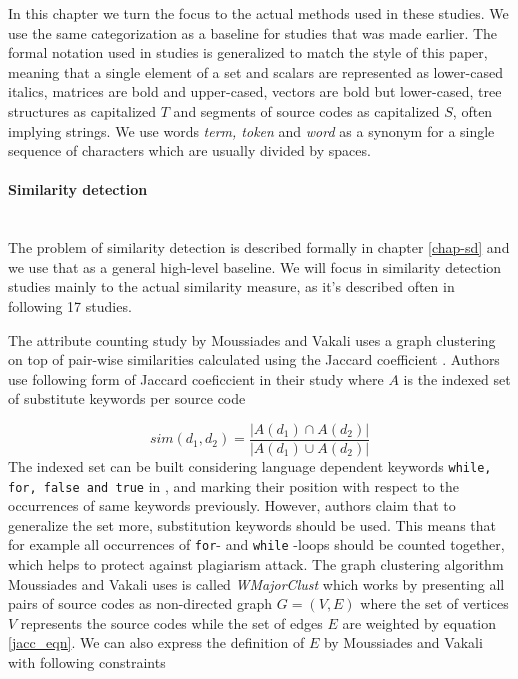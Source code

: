 In this chapter we turn the focus to the actual methods used in these studies. We use the same categorization as a baseline for studies that was made earlier. The formal notation used in studies is generalized to match the style of this paper, meaning that a single element of a set and scalars are represented as lower-cased italics, matrices are bold and upper-cased, vectors are bold but lower-cased, tree structures as capitalized $T$ and segments of source codes as capitalized $S$, often implying strings. We use words \emph{term, token} and \emph{word} as a synonym for a single sequence of characters which are usually divided by spaces.

\paragraph{Similarity detection}\mbox{}\\
The problem of similarity detection is described formally in chapter \ref{chap-sd} and we use that as a general high-level baseline. We will focus in similarity detection studies mainly to the actual similarity measure, as it's described often in following 17 studies.


The attribute counting study by Moussiades and Vakali uses a graph clustering on top of pair-wise similarities calculated using the Jaccard coefficient \cite{PACASCD2005}. Authors use following form of Jaccard coeficcient in their study where $A$ is the indexed set of substitute keywords per source code 

\begin{equation}\label{jacc_eqn}
    sim(d_1, d_2) = \dfrac{|A(d_1) \cap A(d_2)|}{|A(d_1) \cup A(d_2)|}
\end{equation}
\noindent
The indexed set can be built considering language dependent keywords \eg \texttt{while, for, false and true} in \cpp, and marking their position with respect to the occurrences of same keywords previously. However, authors claim that to generalize the set more, substitution keywords should be used. This means that for example all occurrences of \texttt{for}- and \texttt{while} -loops should be counted together, which helps to protect against plagiarism attack. The graph clustering algorithm Moussiades and Vakali uses is called \emph{WMajorClust} which works by presenting all pairs of source codes as non-directed graph $G = (V, E)$ where the set of vertices $V$ represents the source codes while the set of edges $E$ are weighted by equation \ref{jacc_eqn}. We can also express the definition of $E$ by Moussiades and Vakali with following constraints

